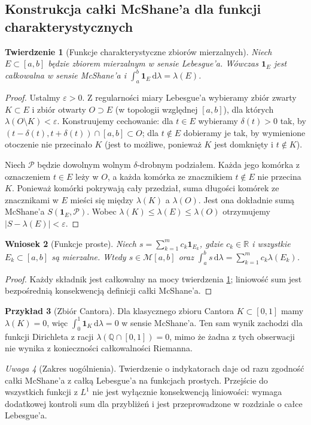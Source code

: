 \documentclass[11pt,a4paper]{article}
\numberwithin{equation}{section}
\theoremstyle{plain}
\newtheorem{twierdzenie}{Twierdzenie}[section]
\newtheorem{wniosek}[twierdzenie]{Wniosek}
\theoremstyle{definition}
\newtheorem{przyklad}[twierdzenie]{Przykład}
\theoremstyle{remark}
\newtheorem{uwaga}[twierdzenie]{Uwaga}
\newcommand{\R}{\mathbb R}
\newcommand{\Q}{\mathbb Q}
\newcommand{\ind}[1]{\mathbf 1_{#1}}
\begin{document}
\subsection*{Konstrukcja całki McShane'a dla funkcji charakterystycznych}
\begin{twierdzenie}[Funkcje charakterystyczne zbiorów mierzalnych]\label{tw:mcshane-indykator}
Niech $E\subset[a,b]$ będzie zbiorem mierzalnym w sensie Lebesgue'a. Wówczas $\ind E$ jest całkowalna w sensie McShane'a i
$\int_a^b\ind E\,\mathrm d\lambda=\lambda(E)$.
\end{twierdzenie}
\begin{proof}
Ustalmy $\varepsilon>0$. Z regularności miary Lebesgue'a wybieramy zbiór zwarty $K\subset E$ i zbiór otwarty $O\supset E$ (w topologii względnej $[a,b]$), dla których $\lambda(O\setminus K)<\varepsilon$. Konstruujemy cechowanie: dla $t\in E$ wybieramy $\delta(t)>0$ tak, by $(t-\delta(t),t+\delta(t))\cap[a,b]\subset O$; dla $t\notin E$ dobieramy je tak, by wymienione otoczenie nie przecinało $K$ (jest to możliwe, ponieważ $K$ jest domknięty i $t\notin K$).

Niech $\mathcal P$ będzie dowolnym wolnym $\delta$-drobnym podziałem. Każda jego komórka z oznaczeniem $t\in E$ leży w $O$, a każda komórka ze znacznikiem $t\notin E$ nie przecina $K$. Ponieważ komórki pokrywają cały przedział, suma długości komórek ze znacznikami w $E$ mieści się między $\lambda(K)$ a $\lambda(O)$. Jest ona dokładnie sumą McShane'a $S(\ind E,\mathcal P)$. Wobec $\lambda(K)\le\lambda(E)\le\lambda(O)$ otrzymujemy $|S-\lambda(E)|<\varepsilon$.
\end{proof}
\begin{wniosek}[Funkcje proste]\label{wn:mcshane-proste}
Niech $s=\sum_{k=1}^m c_k\ind{E_k}$, gdzie $c_k\in\R$ i wszystkie $E_k\subset[a,b]$ są mierzalne. Wtedy $s\in\mathcal M[a,b]$ oraz $\int_a^b s\,\mathrm d\lambda=\sum_{k=1}^m c_k\lambda(E_k)$.
\end{wniosek}
\begin{proof}
Każdy składnik jest całkowalny na mocy twierdzenia \ref{tw:mcshane-indykator}; liniowość sum jest bezpośrednią konsekwencją definicji całki McShane'a.
\end{proof}
\begin{przyklad}[Zbiór Cantora]
Dla klasycznego zbioru Cantora $K\subset[0,1]$ mamy $\lambda(K)=0$, więc $\int_0^1\ind K\,\mathrm d\lambda=0$ w sensie McShane'a. Ten sam wynik zachodzi dla funkcji Dirichleta z racji $\lambda(\Q\cap[0,1])=0$, mimo że żadna z tych obserwacji nie wynika z konieczności całkowalności Riemanna.
\end{przyklad}
\begin{uwaga}[Zakres uogólnienia]
Twierdzenie o indykatorach daje od razu zgodność całki McShane'a z całką Lebesgue'a na funkcjach prostych. Przejście do wszystkich funkcji z $L^1$ nie jest wyłącznie konsekwencją liniowości: wymaga dodatkowej kontroli sum dla przybliżeń i jest przeprowadzone w rozdziale o całce Lebesgue'a.
\end{uwaga}
\end{document}

